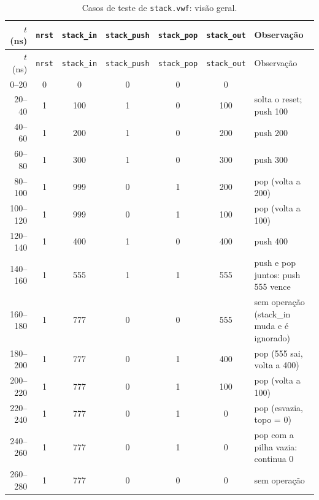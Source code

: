 {\scriptsize\setlength{\tabcolsep}{3pt}
\begin{longtable}{rcccccp{5.7cm}}
\caption{Casos de teste de \texttt{stack.vwf}: visão geral.}
\label{tab:caso-stack}\\
\hline $t$ (ns) & \texttt{nrst} & \texttt{stack\_in} & \texttt{stack\_push} & \texttt{stack\_pop} & \texttt{stack\_out} & Observação \\ \hline \endfirsthead
\hline $t$ (ns) & \texttt{nrst} & \texttt{stack\_in} & \texttt{stack\_push} & \texttt{stack\_pop} & \texttt{stack\_out} & Observação \\ \hline \endhead
0--20 & 0 & 0 & 0 & 0 & 0 &  \\
20--40 & 1 & 100 & 1 & 0 & 100 & solta o reset; push 100 \\
40--60 & 1 & 200 & 1 & 0 & 200 & push 200 \\
60--80 & 1 & 300 & 1 & 0 & 300 & push 300 \\
80--100 & 1 & 999 & 0 & 1 & 200 & pop (volta a 200) \\
100--120 & 1 & 999 & 0 & 1 & 100 & pop (volta a 100) \\
120--140 & 1 & 400 & 1 & 0 & 400 & push 400 \\
140--160 & 1 & 555 & 1 & 1 & 555 & push e pop juntos: push 555 vence \\
160--180 & 1 & 777 & 0 & 0 & 555 & sem operação (stack\_in muda e é ignorado) \\
180--200 & 1 & 777 & 0 & 1 & 400 & pop (555 sai, volta a 400) \\
200--220 & 1 & 777 & 0 & 1 & 100 & pop (volta a 100) \\
220--240 & 1 & 777 & 0 & 1 & 0 & pop (esvazia, topo = 0) \\
240--260 & 1 & 777 & 0 & 1 & 0 & pop com a pilha vazia: continua 0 \\
260--280 & 1 & 777 & 0 & 0 & 0 & sem operação \\
\hline
\end{longtable}}
\vspace{-0.9cm}
